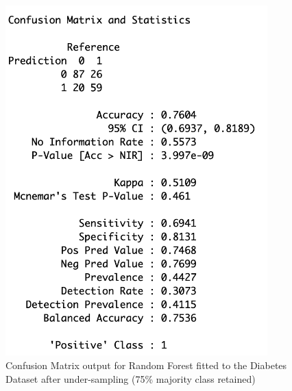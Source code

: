 \begin{figure}[!htbp]
\begin{minipage}{0.45\textwidth}
        \includegraphics[width=0.9\textwidth]{ThesisTemplate/appendix/images/Chapter5Appendix/ConfusionMatrix75/Diabetes.png}
        \caption{Confusion Matrix output for Random Forest fitted to the Diabetes Dataset after under-sampling (75\% majority class retained)}
        \label{fig:my_label}
    \end{minipage}
\end{figure}

